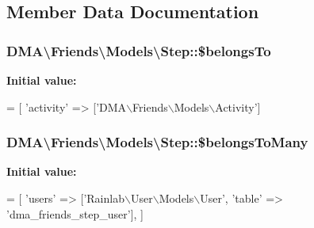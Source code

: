 \subsection{Member Data Documentation}
\hypertarget{classDMA_1_1Friends_1_1Models_1_1Step_a1e83eefa3362e3a1ec89b5599823c22d}{}
\subsubsection[{\$belongs\+To}]{\setlength{\rightskip}{0pt plus 5cm}D\+M\+A\textbackslash{}\+Friends\textbackslash{}\+Models\textbackslash{}\+Step\+::\$belongs\+To}\label{classDMA_1_1Friends_1_1Models_1_1Step_a1e83eefa3362e3a1ec89b5599823c22d}
{\bfseries Initial value\+:}
\begin{DoxyCode}
= [
        \textcolor{stringliteral}{'activity'}  => [\textcolor{stringliteral}{'DMA\(\backslash\)Friends\(\backslash\)Models\(\backslash\)Activity'}]
\end{DoxyCode}
\hypertarget{classDMA_1_1Friends_1_1Models_1_1Step_ac0b25912a2d3c62aa72e15e443648d81}{}
\subsubsection[{\$belongs\+To\+Many}]{\setlength{\rightskip}{0pt plus 5cm}D\+M\+A\textbackslash{}\+Friends\textbackslash{}\+Models\textbackslash{}\+Step\+::\$belongs\+To\+Many}\label{classDMA_1_1Friends_1_1Models_1_1Step_ac0b25912a2d3c62aa72e15e443648d81}
{\bfseries Initial value\+:}
\begin{DoxyCode}
= [
        \textcolor{stringliteral}{'users'} => [\textcolor{stringliteral}{'Rainlab\(\backslash\)User\(\backslash\)Models\(\backslash\)User'}, \textcolor{stringliteral}{'table'} => \textcolor{stringliteral}{'dma\_friends\_step\_user'}],
    ]
\end{DoxyCode}
\hypertarget{classDMA_1_1Friends_1_1Models_1_1Step_ae1aa1ff83758491327ea35861828b233}{}
